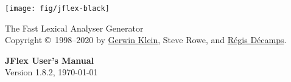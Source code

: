 \documentclass[11pt]{scrartcl}
\begin{document}
\centerline{\texttt{[image: fig/jflex-black]}}

\begin{center}
\sffamily
{\Large The Fast Lexical Analyser Generator}\\
\smallskip\smallskip
Copyright \copyright\ 1998--2020 by \href{http://www.doclsf.de}{Gerwin Klein},
Steve Rowe, and \href{http://regis.decamps.info/}{R\'egis D\'ecamps}.

\vspace*{15ex}
{\Huge \sffamily \bfseries JFlex User's Manual}\\
\bigskip
Version 1.8.2, {\today}
\end{center}

\newpage
\tableofcontents
\newpage












\newpage



\end{document}
